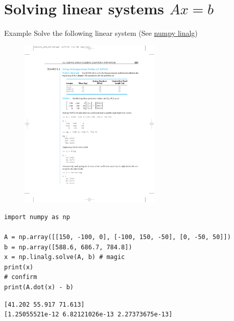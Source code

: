 \documentclass[xcolor=svgnames,t,10pt,allowframebreaks]{beamer}
\begin{document}
\section{Solving linear systems \(Ax = b\)}
\label{sec:org324b4f0}
\begin{frame}[fragile,label={sec:org865dd59}]{Example}
 Solve the following linear system  (See \href{https://docs.scipy.org/doc/numpy/reference/generated/numpy.linalg.solve.html}{numpy linalg}) \\

\begin{figure}[H]

\includegraphics[width=0.6\textwidth]{fig/linear-example-01.pdf}
\end{figure}

\pause

\begin{verbatim}
import numpy as np

A = np.array([[150, -100, 0], [-100, 150, -50], [0, -50, 50]])
b = np.array([588.6, 686.7, 784.8])
x = np.linalg.solve(A, b) # magic
print(x)
# confirm
print(A.dot(x) - b)
\end{verbatim}
\pause
{\vspace*{-4ex}\small
\begin{verbatim}
[41.202 55.917 71.613]
[1.25055521e-12 6.82121026e-13 2.27373675e-13]
\end{verbatim}
}
\end{frame}
\end{document}
